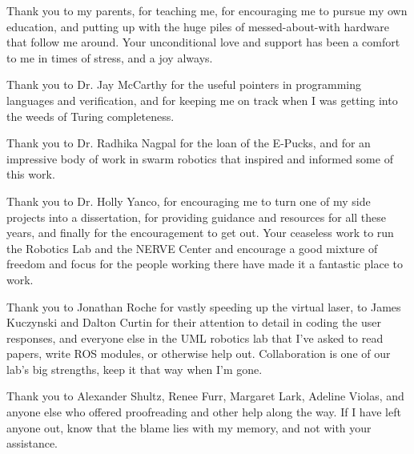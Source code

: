 Thank you to my parents, for teaching me, for encouraging me to pursue my own education, and putting up with the huge piles of messed-about-with hardware that follow me around. Your unconditional love and support has been a comfort to me in times of stress, and a joy always.

Thank you to Dr. Jay McCarthy for the useful pointers in programming languages and verification, and for keeping me on track when I was getting into the weeds of Turing completeness. 

Thank you to Dr. Radhika Nagpal for the loan of the E-Pucks, and for an impressive body of work in swarm robotics that inspired and informed some of this work. 

Thank you to Dr. Holly Yanco, for encouraging me to turn one of my side projects into a dissertation, for providing guidance and resources for all these years, and finally for the encouragement to get out. Your ceaseless work to run the Robotics Lab and the NERVE Center and encourage a good mixture of freedom and focus for the people working there have made it a fantastic place to work. 

Thank you to Jonathan Roche for vastly speeding up the virtual laser, to James Kuczynski and Dalton Curtin for their attention to detail in coding the user responses, and everyone else in the UML robotics lab that I've asked to read papers, write ROS modules, or otherwise help out. Collaboration is one of our lab's big strengths, keep it that way when I'm gone.  

Thank you to Alexander Shultz, Renee Furr, Margaret Lark, Adeline Violas, and anyone else who offered proofreading and other help along the way. If I have left anyone out, know that the blame lies with my memory, and not with your assistance. 

